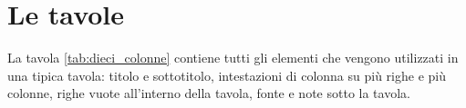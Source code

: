 \documentclass[a4paper, 12pt]{article}\usepackage[]{graphicx}\usepackage[]{color}
\begin{document}
\VerbatimFootnotes %







\section{Le tavole} 
\label{sec:tavole}

La tavola \ref{tab:dieci_colonne} contiene tutti gli elementi che vengono utilizzati in una tipica tavola: titolo e sottotitolo, intestazioni di colonna su più righe e più colonne, righe vuote all'interno della tavola, fonte e note sotto la tavola.
\end{document}
